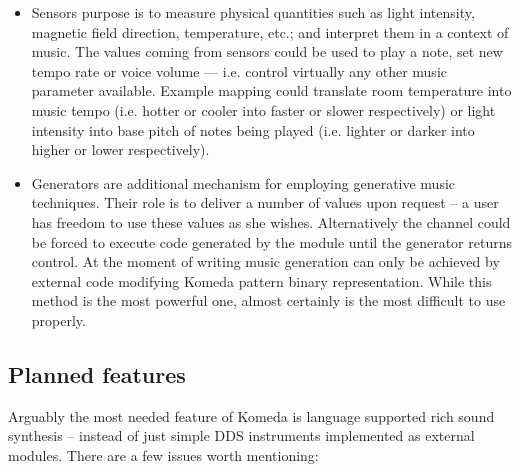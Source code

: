 \documentclass{article}
\begin{document}
\begin{itemize}
  \item Sensors purpose is to measure physical quantities such as light
    intensity, magnetic field direction, temperature, etc.; and interpret them
    in a context of music. The values coming from sensors could be used to play
    a note, set new tempo rate or voice volume --- i.e. control virtually any
    other music parameter available. Example mapping could translate room
    temperature into music tempo (i.e. hotter or cooler into faster or slower
    respectively) or light intensity into base pitch of notes being played
    (i.e. lighter or darker into higher or lower respectively).

  \item Generators are additional mechanism for employing generative music
    techniques. Their role is to deliver a number of values upon request -- a
    user has freedom to use these values as she wishes. Alternatively the
    channel could be forced to execute code generated by the module until the
    generator returns control. At the moment of writing music generation can
    only be achieved by external code modifying Komeda pattern binary
    representation. While this method is the most powerful one, almost
    certainly is the most difficult to use properly. 
\end{itemize}

\subsection{Planned features}

Arguably the most needed feature of Komeda is language supported rich sound
synthesis -- instead of just simple DDS instruments implemented as external
modules. There are a few issues worth mentioning:
\end{document}
